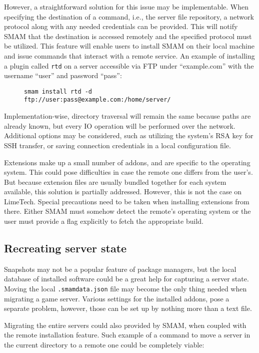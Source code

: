 However, a straightforward solution for this issue may be implementable.
When specifying the destination of a command, i.e., the server file repository, a network protocol along with any needed credentials can be provided.
This will notify SMAM that the destination is accessed remotely and the specified protocol must be utilized.
This feature will enable users to install SMAM on their local machine and issue commands that interact with a remote service.
An example of installing a plugin called \verb|rtd| on a server accessible via FTP under ``example.com'' with the username ``user'' and password ``pass'':

\begin{figure}[htp]
\centering
\verb|smam install rtd -d ftp://user:pass@example.com:/home/server/|
\end{figure}

Implementation-wise, directory traversal will remain the same because paths are already known, but every IO operation will be performed over the network.
Additional options may be considered, such as utilizing the system's RSA key for SSH transfer, or saving connection credentials in a local configuration file.

Extensions make up a small number of addons, and are specific to the operating system.
This could pose difficulties in case the remote one differs from the user's.
But because extension files are usually bundled together for each system available, this solution is partially addressed.
However, this is not the case on LimeTech.
Special precautions need to be taken when installing extensions from there.
Either SMAM must somehow detect the remote's operating system or the user must provide a flag explicitly to fetch the appropriate build.

\subsection{Recreating server state}

Snapshots may not be a popular feature of package managers, but the local database of installed software could be a great help for capturing a server state.
Moving the local \verb|.smamdata.json| file may become the only thing needed when migrating a game server.
Various settings for the installed addons, pose a separate problem, however, those can be set up by nothing more than a text file.

Migrating the entire servers could also provided by SMAM, when coupled with the remote installation feature.
Such example of a command to move a server in the current directory to a remote one could be completely viable:

